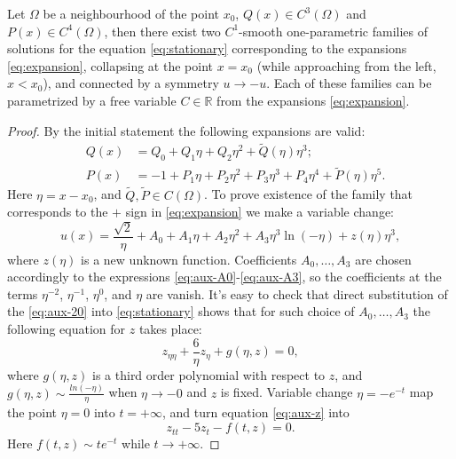 \begin{proposition}
	Let $\Omega$ be a neighbourhood of the point $x_0$, $Q(x) \in C^3(\Omega)$ and $P(x) \in C^4(\Omega)$, then there exist two $C^1$-smooth one-parametric families of solutions for the equation \eqref{eq:stationary} corresponding to the expansions \eqref{eq:expansion}, collapsing at the point $x = x_0$ (while approaching from the left, $x < x_0$), and connected by a symmetry $u \to -u$.
	Each of these families can be parametrized by a free variable $C \in \mathbb{R}$ from the expansions \eqref{eq:expansion}.
\label{prop:singular-families}
\end{proposition}
\begin{proof}
	By the initial statement the following expansions are valid:
	\begin{eqnarray}
		& Q(x) & = Q_0 + Q_1 \eta + Q_2 \eta^2 + \widetilde{Q}(\eta) \eta^3; \\
		& P(x) & = -1 + P_1 \eta + P_2 \eta^2 + P_3 \eta^3 + P_4 \eta^4 + \widetilde{P}(\eta) \eta^5.
	\end{eqnarray}
	Here $\eta = x - x_0$, and $\widetilde{Q}, \widetilde{P} \in C(\Omega)$.
	To prove existence of the family that corresponds to the $+$ sign in \eqref{eq:expansion}	 we make a variable change:
	\begin{equation}
		u(x) = \dfrac{\sqrt{2}}{\eta} + A_0 + A_1 \eta + A_2 \eta^2 + A_3 \eta^3 \ln(-\eta) + z(\eta) \eta^3,
		\label{eq:aux-20}
	\end{equation}
	where $z(\eta)$ is a new unknown function.
	Coefficients $A_0, \dots, A_3$ are chosen accordingly to the expressions \eqref{eq:aux-A0}-\eqref{eq:aux-A3}, so the coefficients at the terms $\eta^{-2}$, $\eta^{-1}$, $\eta^0$, and $\eta$ are vanish.
	It's easy to check that direct substitution of the \eqref{eq:aux-20} into \eqref{eq:stationary} shows that for such choice of $A_0, \dots, A_3$ the following equation for $z$ takes place:
	\begin{equation}
		z_{\eta\eta} + \dfrac{6}{\eta} z_{\eta} + g(\eta, z) = 0,
		\label{eq:aux-z}
	\end{equation}
	where $g(\eta, z)$ is a third order polynomial with respect to $z$, and $g(\eta, z) \sim \frac{ln(-\eta)}{\eta}$ when $\eta \to -0$ and $z$ is fixed.
	Variable change $\eta = -e^{-t}$ map the point $\eta = 0$ into $t = +\infty$, and turn equation \eqref{eq:aux-z} into
	\begin{equation}
		z_{tt} - 5z_t - f(t, z) = 0.
		\label{eq:aux-zt}
	\end{equation}
	Here $f(t, z) \sim t e^{-t}$ while $t \to +\infty$.

\end{proof}
